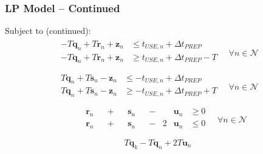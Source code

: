 \documentclass{beamer}
\begin{document}
\begin{frame}
\frametitle{LP Model -- Continued}
\tiny
Subject to (continued):
\begin{equation*}
    \begin{split}
        \begin{alignedat}{2}
            -T \boldsymbol{q}_{n} + T \boldsymbol{r}_{n} + \boldsymbol{z}_{n}
            &\le t_{\mathit{USE},n} + \Delta t_{\mathit{PREP}}\\
            -T \boldsymbol{q}_{n} + T \boldsymbol{r}_{n} + \boldsymbol{z}_{n}
            &\ge t_{\mathit{USE},n} + \Delta t_{\mathit{PREP}} - T\\
            \end{alignedat}
        \quad \forall n \in \mathcal{N}
    \end{split}
\end{equation*}
\begin{equation*}
    \begin{split}
        \begin{alignedat}{2}
            T \boldsymbol{q}_{n} + T \boldsymbol{s}_{n} - \boldsymbol{z}_{n}
            &\le -t_{\mathit{USE},n} + \Delta t_{\mathit{PREP}}\\
            T \boldsymbol{q}_{n} + T \boldsymbol{s}_{n} - \boldsymbol{z}_{n}
            &\ge -t_{\mathit{USE},n} + \Delta t_{\mathit{PREP}} + T\\
            \end{alignedat}
        \quad \forall n \in \mathcal{N}
    \end{split}
\end{equation*}
\begin{equation*}
    \begin{split}
        \begin{alignedat}{8}
            &&\boldsymbol{r}_{n} && {}+{} &&\boldsymbol{s}_{n} && {}-{} 
            &&\boldsymbol{u}_{n} &\ge 0\\
            &&\boldsymbol{r}_{n} && {}+{} &&\boldsymbol{s}_{n} && {}-{} 
            &2&\boldsymbol{u}_{n} &\le 0\\
        \end{alignedat}
        \quad \forall n \in \mathcal{N}
    \end{split}
\end{equation*}
\begin{equation*}
    \begin{split}
        \begin{aligned}
            T \boldsymbol{q}_{k} - T \boldsymbol{q}_{n} + 2T \boldsymbol{u}_{n} 

\end{aligned}
\end{split}
\end{equation*}
\end{frame}
\end{document}
